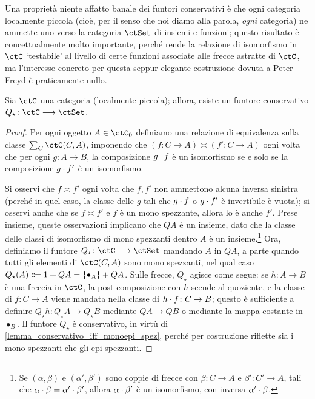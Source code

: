 Una proprietà niente affatto banale dei funtori conservativi è che ogni categoria localmente piccola (cioè, per il senso che noi diamo alla parola, \emph{ogni} categoria) ne ammette uno verso la categoria \(\ctSet\) di insiemi e funzioni; questo risultato è concettualmente molto importante, perché rende la relazione di isomorfismo in \(\ctC\) `testabile' al livello di certe funzioni associate alle frecce astratte di \(\ctC\), ma l'interesse concreto per questa seppur elegante costruzione dovuta a Peter Freyd \cite{fconc} è praticamente nullo.
\begin{theorem}
 Sia \(\ctC\) una categoria (localmente piccola); allora, esiste un funtore conservativo \(Q_\star \colon \ctC\fun\ctSet\).
\end{theorem}
\begin{proof}
 Per ogni oggetto \(A\in\ctC_0\) definiamo una relazione di equivalenza sulla classe \(\sum_C\Hom{\ctC}(C,A)\), imponendo che \((f \colon C\to A)\asymp(f' \colon C\to A)\) ogni volta che per ogni \(g \colon A\to B\), la composizione \(g\cdot f\) è un isomorfismo se e solo se la composizione \(g\cdot f'\) è un isomorfismo.

 Si osservi che \(f\asymp f'\) ogni volta che \(f,f'\) non ammettono alcuna inversa sinistra (perché in quel caso, la classe delle \(g\) tali che \(g\cdot f\) o \(g\cdot f'\) è invertibile è vuota); si osservi anche che se \(f\asymp f'\) e \(f\) è un mono spezzante, allora lo è anche \(f'\). Prese insieme, queste osservazioni implicano che \(QA\) è un insieme, dato che la classe delle classi di isomorfismo di mono spezzanti dentro \(A\) è un insieme.\footnote{Se \((\alpha,\beta)\) e \((\alpha',\beta')\) sono coppie di frecce con \(\beta \colon C\to A\) e \(\beta' \colon C'\to A\), tali che \(\alpha\cdot\beta = \alpha'\cdot\beta'\), allora \(\alpha\cdot\beta'\) è un isomorfismo, con inversa \(\alpha'\cdot\beta\).} Ora, definiamo il funtore \(Q_\star \colon \ctC\fun\ctSet\) mandando \(A\) in \(QA\), a parte quando tutti gli elementi di \(\Hom{\ctC}(C,A)\) sono mono spezzanti, nel qual caso \(Q_\star(A)\defeq 1+QA = \{\bullet_A\}+QA\). Sulle frecce, \(Q_\star\) agisce come segue: se \(h \colon A\to B\) è una freccia in \(\ctC\), la post-composizione con \(h\) scende al quoziente, e la classe di \(f \colon C\to A\) viene mandata nella classe di \(h\cdot f \colon C\to B\); questo è sufficiente a definire \(Q_\star h \colon Q_\star A \to Q_\star B\) mediante \(QA\to QB\) o mediante la mappa costante in \(\bullet_B\).	Il funtore \(Q_\star\) è conservativo, in virtù di \ref{lemma_conservativo_iff_monoepi_spez}, perché per costruzione riflette sia i mono spezzanti che gli epi spezzanti.
\end{proof}
